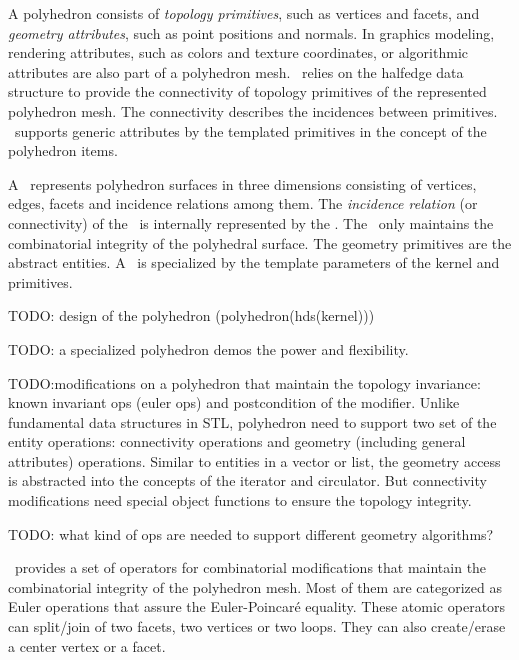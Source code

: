 A polyhedron consists of \emph{topology primitives}, 
such as vertices and facets, and \emph{geometry attributes}, 
such as point positions and normals. 
In graphics modeling, rendering attributes, 
such as colors and texture coordinates, or algorithmic 
attributes are also part of a polyhedron mesh.
\cgalpoly\ relies on the halfedge data 
structure \cite{hds} to provide the connectivity of 
topology primitives of the represented polyhedron mesh. 
The connectivity describes the incidences between 
primitives. \poly\ supports generic attributes 
by the templated primitives in the concept of the polyhedron
items.

A \cgalpoly\ represents polyhedron surfaces in three dimensions
consisting of vertices, edges, facets and incidence relations among them.
The \emph{incidence relation} (or connectivity) of the \poly\ is
internally represented by the \cgalhds . 
The \poly\ only maintains the combinatorial integrity of the 
polyhedral surface. The geometry primitives are the abstract 
entities. A \poly\ is specialized by the
template parameters of the kernel and primitives.

TODO: design of the polyhedron (polyhedron(hds(kernel)))

TODO: a specialized polyhedron demos the power and flexibility.

TODO:modifications on a polyhedron that maintain the topology invariance:
known invariant ops (euler ops) and postcondition of the modifier. Unlike
fundamental data structures in STL, polyhedron need to support two
set of the entity operations: connectivity operations and geometry 
(including general attributes) operations. Similar to 
entities in a vector or list, the geometry access is
abstracted into the concepts of the iterator and circulator.
But connectivity modifications need special object functions
to ensure the topology integrity.

TODO: what kind of ops are needed to support different geometry algorithms?

\cgalpoly\ provides a set of operators for combinatorial 
modifications that maintain the combinatorial integrity
of the polyhedron mesh. Most of them are categorized as Euler operations
that assure the Euler-Poincar\'e equality.
These atomic operators can split/join of two facets, two vertices 
or two loops. They can also create/erase a center vertex or a facet.

